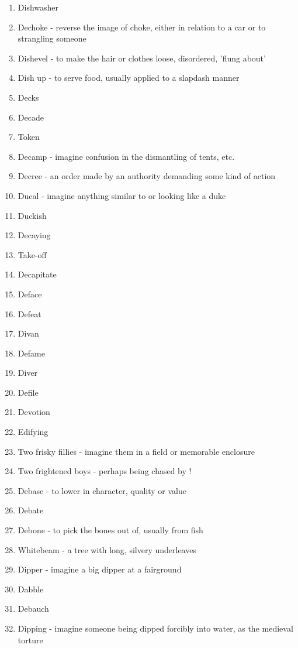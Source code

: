 \begin{enumerate}
        \item Dishwasher
        \item Dechoke - reverse the image of choke, either in relation to a car or to strangling someone
        \item Dishevel - to make the hair or clothes loose, disordered, 'flung about'
        \item Dish up - to serve food, usually applied to a slapdash manner
        \item Decks
        \item Decade
        \item Token
        \item	Decamp - imagine confusion in the dismantling of tents, etc.
        \item	Decree - an order made by an authority demanding some kind of action
        \item	Ducal - imagine anything similar to or looking like a duke
        \item	Duckish
        \item	Decaying
        \item	Take-off
        \item	Decapitate
        \item	Deface
        \item	Defeat
        \item	Divan
        \item	Defame
        \item	Diver
        \item	Defile
        \item	Devotion
        \item	Edifying
        \item	Two frisky fillies - imagine them in a field or memorable enclosure
        \item	Two frightened boys - perhaps being chased by !
        \item	Debase - to lower in character, quality or value
        \item Debate
        \item Debone - to pick the bones out of, usually from fish
        \item Whitebeam - a tree with long, silvery underleaves
        \item Dipper - imagine a big dipper at a fairground
        \item Dabble
        \item Debauch
        \item Dipping - imagine someone being dipped forcibly into water, as the medieval torture

\end{enumerate}

